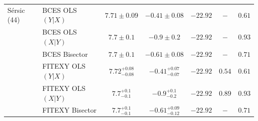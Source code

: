 \documentclass[preprint2]{emulateapj}
\begin{document}
\begin{table}
\begin{tabular}{llccccc}
S\'ersic (44) & BCES OLS$(Y|X)$   & $7.71 \pm 0.09$ & $-0.41 \pm 0.08$ & $-22.92$ & $-$    & $0.61$ \\
              & BCES OLS$(X|Y)$   & $7.7  \pm 0.1$  & $-0.9  \pm 0.2 $ & $-22.92$ & $-$    & $0.93$ \\
              & BCES Bisector     & $7.7  \pm 0.1$  & $-0.61 \pm 0.08$ & $-22.92$ & $-$    & $0.71$ \\
              & FITEXY OLS$(Y|X)$ & $7.72^{+0.08}_{-0.08}$ & ${-0.41}^{+0.07}_{-0.07}$ & $-22.92$ & $0.54$ & $0.61$ \\
              & FITEXY OLS$(X|Y)$ & $7.7^{+0.1}_{-0.1}$ & $-0.9^{+0.1}_{-0.2}$ & $-22.92$ & $0.89$ & $0.93$ \\
              & FITEXY Bisector   & $7.7^{+0.1}_{-0.1}$ & $-0.61^{+0.09}_{-0.12}$ & $-22.92$ & $-$	& $0.71$ \\


\end{tabular}
\end{table}
\end{document}
